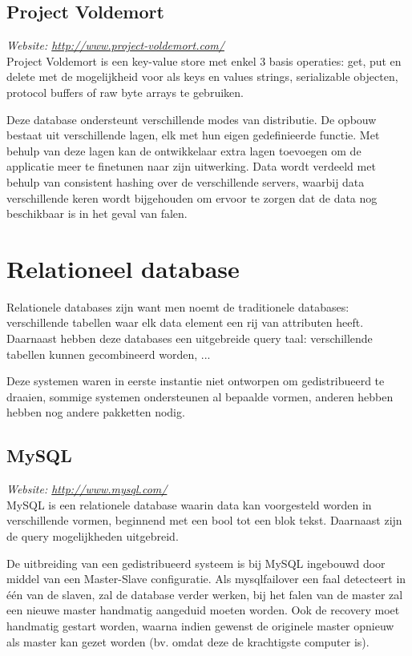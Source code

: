 \subsection{Project Voldemort}
\textit{Website: \url{http://www.project-voldemort.com/}}\\
Project Voldemort is een key-value store met enkel 3 basis operaties: get, put en delete met de mogelijkheid voor als keys en values strings, serializable objecten, protocol buffers of raw byte arrays te gebruiken. 

Deze database ondersteunt verschillende modes van distributie. De opbouw bestaat uit verschillende lagen, elk met hun eigen gedefinieerde functie. Met behulp van deze lagen kan de ontwikkelaar extra lagen toevoegen om de applicatie meer te finetunen naar zijn uitwerking. 
Data wordt verdeeld met behulp van consistent hashing over de verschillende servers, waarbij data verschillende keren wordt bijgehouden om ervoor te zorgen dat de data nog beschikbaar is in het geval van falen. 

\section{Relationeel database}
Relationele databases zijn want men noemt de traditionele databases: verschillende tabellen waar elk data element een rij van attributen heeft. Daarnaast hebben deze databases een uitgebreide query taal: verschillende tabellen kunnen gecombineerd worden, ... 

Deze systemen waren in eerste instantie niet ontworpen om gedistribueerd te draaien, sommige systemen ondersteunen al bepaalde vormen, anderen hebben hebben nog andere pakketten nodig. 
\subsection{MySQL}
\textit{Website: \url{http://www.mysql.com/}}\\
MySQL is een relationele database waarin data kan voorgesteld worden in verschillende vormen, beginnend met een bool tot een blok tekst. Daarnaast zijn de query mogelijkheden uitgebreid. 

De uitbreiding van een gedistribueerd systeem is bij MySQL ingebouwd door middel van een Master-Slave configuratie. Als mysqlfailover een faal detecteert in één van de slaven, zal de database verder werken, bij het falen van de master zal een nieuwe master handmatig aangeduid moeten worden. Ook de recovery moet handmatig gestart worden, waarna indien gewenst de originele master opnieuw als master kan gezet worden (bv. omdat deze de krachtigste computer is). 

